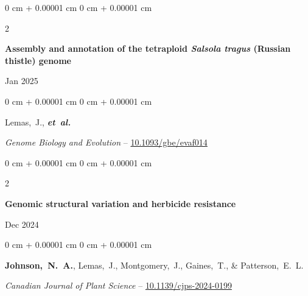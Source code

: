\documentclass[10pt, letterpaper]{article}
\newenvironment{onecolentry}{
    \begin{adjustwidth}{
        0 cm + 0.00001 cm
    }{
        0 cm + 0.00001 cm
    }
}{
    \end{adjustwidth}
} %
\newenvironment{twocolentry}[2][]{
    \onecolentry
    \def\secondColumn{#2}
    \setcolumnwidth{\fill, 4.5 cm}
    \begin{paracol}{2}
}{
    \switchcolumn \raggedleft \secondColumn
    \end{paracol}
    \endonecolentry
} %
\begin{document}
        \begin{samepage}
            \begin{twocolentry}{
                Jan 2025
                }
                \textbf{Assembly and annotation of the tetraploid \textit{Salsola tragus} (Russian thistle) genome}
            \end{twocolentry}

            \vspace{0.10 cm}
            
            \begin{onecolentry}
                \mbox{Lemas, J.}, \mbox{\textbf{\textit{et al.}}}

                \vspace{0.10 cm}
                
                \textit{Genome Biology and Evolution} -- \href{https://doi.org/10.1093/gbe/evaf014}{10.1093/gbe/evaf014}
            \end{onecolentry}
        \end{samepage}


        \vspace{0.2 cm}


        \begin{samepage}
            \begin{twocolentry}{
                Dec 2024
                }
                \textbf{Genomic structural variation and herbicide resistance}
            \end{twocolentry}

            \vspace{0.10 cm}
            
            \begin{onecolentry}
                \mbox{\textbf{Johnson, N. A.}}, \mbox{Lemas, J.}, \mbox{Montgomery, J.}, \mbox{Gaines, T.}, \& \mbox{Patterson, E. L.}

                \vspace{0.10 cm}
                
                \textit{Canadian Journal of Plant Science} -- \href{https://doi.org/10.1139/cjps-2024-0199}{10.1139/cjps-2024-0199}
            \end{onecolentry}
        \end{samepage}


        \vspace{0.2 cm}
\end{document}
